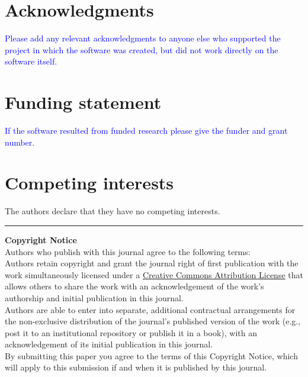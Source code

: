 \documentclass{jors}
\begin{document}
\section*{Acknowledgments}

\textcolor{blue}{Please add any relevant acknowledgments to anyone
  else who supported the project in which the software was created,
  but did not work directly on the software itself.}

\section*{Funding statement}

\textcolor{blue}{If the software resulted from funded research please
  give the funder and grant number.}

\section*{Competing interests}

The authors declare that they have no competing interests.


\printbibliography



\vspace{2cm}

\rule{\textwidth}{1pt}

{ \bf Copyright Notice} \\
Authors who publish with this journal agree to the following terms: \\

Authors retain copyright and grant the journal right of first publication with the work simultaneously licensed under a  \href{http://creativecommons.org/licenses/by/3.0/}{Creative Commons Attribution License} that allows others to share the work with an acknowledgement of the work's authorship and initial publication in this journal. \\

Authors are able to enter into separate, additional contractual arrangements for the non-exclusive distribution of the journal's published version of the work (e.g., post it to an institutional repository or publish it in a book), with an acknowledgement of its initial publication in this journal. \\

By submitting this paper you agree to the terms of this Copyright Notice, which will apply to this submission if and when it is published by this journal.
\end{document}
